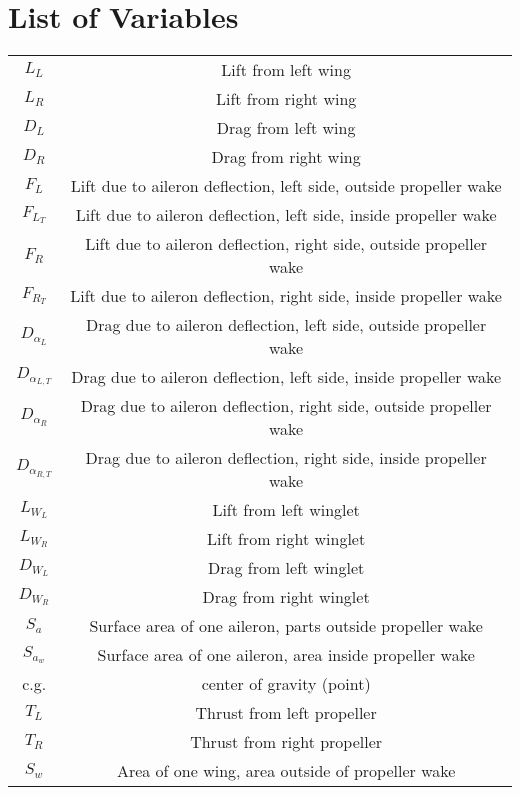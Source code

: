 \section{List of Variables}
\begin{center}\begin{tabular}{| c | c |} 
    $L_L$       & Lift from left wing \\
    $L_R$       & Lift from right wing \\
    $D_L$       & Drag from left wing \\
    $D_R$       & Drag from right wing \\
    $F_L$       & Lift due to aileron deflection, left side, outside propeller wake \\
    $F_{L_T}$   & Lift due to aileron deflection, left side, inside propeller wake \\
    $F_R$       & Lift due to aileron deflection, right side, outside propeller wake \\
    $F_{R_T}$   & Lift due to aileron deflection, right side, inside propeller wake \\
    $D_{\alpha_L}$ & Drag due to aileron deflection, left side, outside propeller wake \\
    $D_{\alpha_{L,T}}$ & Drag due to aileron deflection, left side, inside propeller wake \\
    $D_{\alpha_{R}}$ & Drag due to aileron deflection, right side, outside propeller wake \\
    $D_{\alpha_{R,T}}$ & Drag due to aileron deflection, right side, inside propeller wake \\
    $L_{W_L}$ & Lift from left winglet \\
    $L_{W_R}$ & Lift from right winglet \\
    $D_{W_L}$ & Drag from left winglet \\
    $D_{W_R}$ & Drag from right winglet \\
    $S_a$  & Surface area of one aileron, parts outside propeller wake \\
    $S_{a_w}$ & Surface area of one aileron, area inside propeller wake \\
    c.g.    & center of gravity (point) \\
    $T_L$   & Thrust from left propeller \\ 
    $T_R$   & Thrust from right propeller \\
    $S_w$   & Area of one wing, area outside of propeller wake \\

\end{tabular}
\end{center}
